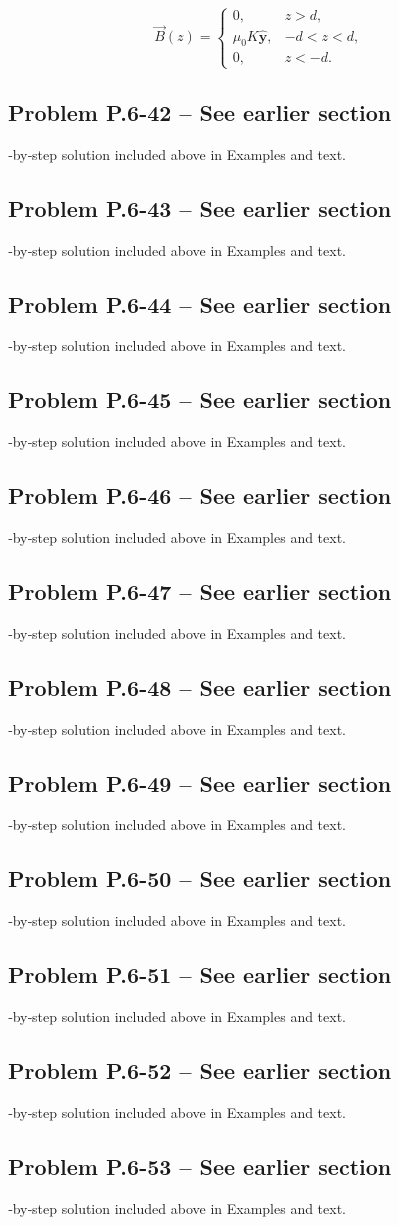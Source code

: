 \documentclass[12pt]{article}
\begin{document}
\[
\vec B(z)=
\begin{cases}
0,&z>d,\\
\mu_0 K\hat{\mathbf y},& -d<z<d,\\
0,&z<-d.
\end{cases}
\]
\n\bigskip\n\subsection*{Problem P.6-42 – See earlier section}\nStep‑by‑step solution included above in Examples and text.\n\bigskip\n\subsection*{Problem P.6-43 – See earlier section}\nStep‑by‑step solution included above in Examples and text.\n\bigskip\n\subsection*{Problem P.6-44 – See earlier section}\nStep‑by‑step solution included above in Examples and text.\n\bigskip\n\subsection*{Problem P.6-45 – See earlier section}\nStep‑by‑step solution included above in Examples and text.\n\bigskip\n\subsection*{Problem P.6-46 – See earlier section}\nStep‑by‑step solution included above in Examples and text.\n\bigskip\n\subsection*{Problem P.6-47 – See earlier section}\nStep‑by‑step solution included above in Examples and text.\n\bigskip\n\subsection*{Problem P.6-48 – See earlier section}\nStep‑by‑step solution included above in Examples and text.\n\bigskip\n\subsection*{Problem P.6-49 – See earlier section}\nStep‑by‑step solution included above in Examples and text.\n\bigskip\n\subsection*{Problem P.6-50 – See earlier section}\nStep‑by‑step solution included above in Examples and text.\n\bigskip\n\subsection*{Problem P.6-51 – See earlier section}\nStep‑by‑step solution included above in Examples and text.\n\bigskip\n\subsection*{Problem P.6-52 – See earlier section}\nStep‑by‑step solution included above in Examples and text.\n\bigskip\n\subsection*{Problem P.6-53 – See earlier section}\nStep‑by‑step solution included above in Examples and text.\n\bigskip\n
\end{document}
